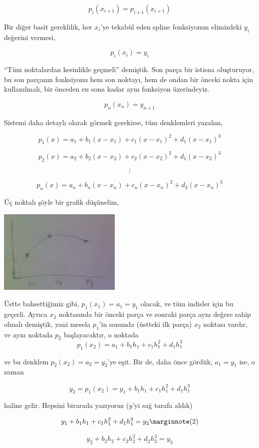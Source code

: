 \documentclass[12pt,fleqn]{article}\usepackage{../../common}
\begin{document}
$$ p_i (x_{i+1}) = p_{i+1}(x_{i+1}) $$

Bir diğer basit gereklilik, her $x_i$'ye tekabül eden spline fonksiyonun
elimizdeki $y_i$ değerini vermesi,

$$ p_i(x_i) = y_i $$

``Tüm noktalardan kesinlikle geçmeli'' demiştik. Son parça bir istisna
oluşturuyor, bu son parçanın fonksiyonu hem son noktayı, hem de ondan bir
önceki nokta için kullanılmalı, bir önceden en sona kadar aynı fonksiyon
üzerindeyiz. 

$$ p_{n}(x_n) = y_{n+1} $$

Sistemi daha detaylı olarak görmek gerekirse, tüm denklemleri yazalım,

$$ p_1(x)  = a_1 + b_1(x-x_1) + c_1(x-x_1)^2 + d_1(x-x_1)^3$$

$$ p_2(x)  = a_2 + b_2(x-x_2) + c_2(x-x_2)^2 + d_1(x-x_2)^3$$

$$ \vdots $$

$$ p_n(x)  = a_n + b_n(x-x_n) + c_n(x-x_n)^2 + d_3(x-x_n)^3$$

Üç noktalı şöyle bir grafik düşünelim,

\includegraphics[height=4cm]{spline2.png}

Üstte bahsettiğimiz gibi, $p_1(x_1) = a_1 = y_1$ olacak, ve tüm indisler
için bu geçerli. Ayrıca $x_2$ noktasında bir önceki parça ve sonraki parça
aynı değere sahip olmalı demiştik, yani mesela $p_1$'in sonunda (üstteki
ilk parça) $x_2$ noktası vardır, ve aynı noktada $p_2$ başlayacaktır, o
noktada $$ p_1(x_2) = a_1 + b_1h_1 + c_1h_1^2 + d_1h_1^3  $$

ve bu denklem $p_2(x_2) = a_2 = y_2$'ye eşit. Bir de, daha önce gördük, $a_1 =
y_1$ ise, o zaman 

$$ y_2 = p_1(x_2) = y_1 + b_1h_1 + c_1h_1^2 + d_1h_1^3 $$

haline gelir. Hepsini birarada yazıyoruz ($y$'yi sağ tarafa aldık)

$$ y_1 + b_1h_1 + c_1h_1^2 + d_1h_1^3 = y_2 
\mlabel{2} 
$$

$$ y_2 + b_2h_2 + c_2h_2^2 + d_2h_2^3 = y_3 $$
\end{document}
